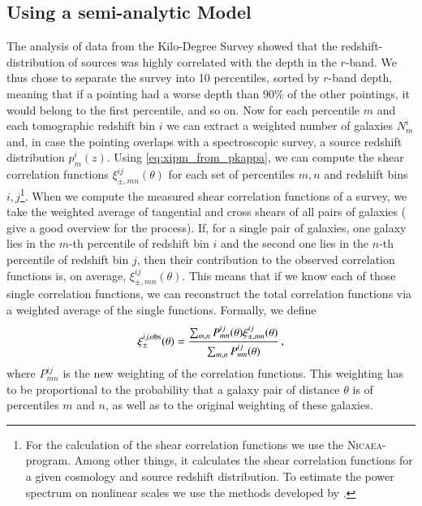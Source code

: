 \subsection{Using a semi-analytic Model}
The analysis of data from the Kilo-Degree Survey showed that the redshift-distribution of sources was highly correlated with the depth in the $r$-band. We thus chose to separate the survey into 10 percentiles, sorted by $r$-band depth, meaning that if a pointing had a worse depth than 90\% of the other pointings, it would belong to the first percentile, and so on. Now for each percentile $m$ and each tomographic redshift bin $i$ we can extract a weighted number of galaxies $N^i_m$ and, in case the pointing overlaps with a spectroscopic survey, a source redshift distribution $p^i_m(z)$. Using \eqref{eq:xipm_from_pkappa}, we can compute the shear correlation functions $\xi_{\pm,mn}^{ij}(\theta)$ for each set of percentiles $m,n$ and redshift bins $i,j$\footnote{For the calculation of the shear correlation functions we use the \textsc{Nicaea}-program. Among other things, it calculates the shear correlation functions for a given cosmology and source redshift distribution. To estimate the power spectrum on nonlinear scales we use the methods developed by \citet{2012ApJ...761..152T}.}. When we compute the measured shear correlation functions of a survey, we take the weighted average of tangential and cross shears of all pairs of galaxies (\citet{2017MNRAS.465.1454H} give a good overview for the process). If, for a single pair of galaxies, one galaxy lies in the $m$-th percentile of redshift bin $i$ and the second one lies in the $n$-th percentile of redshift bin $j$, then their contribution to the observed correlation functions is, on average, $\xi_{\pm,mn}^{ij}(\theta)$. This means that if we know each of those single correlation functions, we can reconstruct the total correlation functions via a weighted average of the single functions. Formally, we define \[
\xi_\pm^{ij,\rm{obs}}(\theta) = \frac{\sum_{m,n} P_{mn}^{ij}(\theta)\xi_{\pm,mn}^{ij}(\theta)}{\sum_{m,n} P_{mn}^{ij}(\theta)}\, ,
\label{eq:def_xiobs}
\]
where $P_{mn}^{ij}$ is the new weighting of the correlation functions. This weighting has to be proportional to the probability that a galaxy pair of distance $\theta$ is of percentiles $m$ and $n$, as well as to the original weighting of these galaxies.

